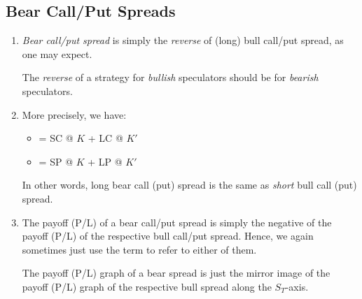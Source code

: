 \subsection{Bear Call/Put Spreads}
\begin{enumerate}
\item \emph{Bear call/put spread} is simply the \emph{reverse} of (long) bull
call/put spread, as one may expect.

\begin{intuition}
The \emph{reverse} of a strategy for \emph{bullish} speculators should be for
\emph{bearish} speculators.
\end{intuition}

\item More precisely, we have:
\begin{itemize}
\item {} = SC @ \(K\) + LC @ \(K'\)
\item {} = SP @ \(K\) + LP @ \(K'\)
\end{itemize}
\begin{note}
In other words, long bear call (put) spread is the same as \emph{short} bull
call (put) spread.
\end{note}

\item The payoff (P/L) of a bear call/put spread is simply the negative of the
payoff (P/L) of the respective bull call/put spread. Hence, we again sometimes
just use the term  to refer to either of them.
\begin{note}
The payoff (P/L) graph of a bear spread is just the mirror image of the payoff
(P/L) graph of the respective bull spread along the \(S_T\)-axis.
\end{note}
\end{enumerate}
